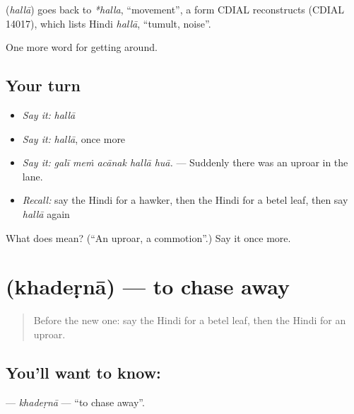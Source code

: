 \begin{cousinweb}
\textbf{} (\emph{hallā}) goes back to \emph{*halla}, \textquotedblleft{}movement\textquotedblright{}, a form CDIAL reconstructs (CDIAL 14017), which lists Hindi \emph{hallā}, \textquotedblleft{}tumult, noise\textquotedblright{}.
\end{cousinweb}

\begin{grammarlens}[title={What you've built}]
One more word for getting around.
\end{grammarlens}

\subsection*{Your turn}
\begin{itemize}
\raggedright
  \item \emph{Say it:} \emph{hallā}
  \item \emph{Say it:} \emph{hallā}, once more
  \item \emph{Say it:} \emph{galī meṁ acānak hallā huā.} — Suddenly there was an uproar in the lane.
  \item \emph{Recall:} say the Hindi for a hawker, then the Hindi for a betel leaf, then say \emph{hallā} again
\end{itemize}

\begin{tcolorbox}[breakable,colback=teal!4,colframe=teal!35!black,title={Before you move on}]
What does  mean? (\textquotedblleft{}An uproar, a commotion\textquotedblright{}.) Say it once more.
\end{tcolorbox}
\section[\texorpdfstring{\hi{खदेड़ना} (khadeṛnā)}{खदेड़ना (khadeṛnā)}]{ (khadeṛnā) — to chase away}

\label{lesson:HI-C425-khaderna}



\begin{quote}
Before the new one: say the Hindi for a betel leaf, then the Hindi for an uproar.
\end{quote}

\subsection*{You'll want to know: }
\textbf{} — \emph{khadeṛnā} — \textquotedblleft{}to chase away\textquotedblright{}.

